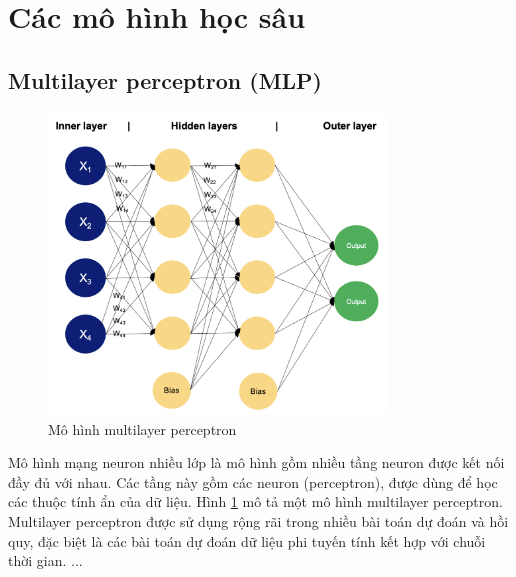 \section{Các mô hình học sâu}
\subsection{Multilayer perceptron (MLP)}

\begin{figure}[h]
    \centering
    \includegraphics[width=0.8\textwidth]{image/section3_4/mlp.png}
    \caption[Mô hình multilayer perceptron]{Mô hình multilayer perceptron \cite{mlp-img}}
    \label{fig:section3_4__1}
\end{figure}


Mô hình mạng neuron nhiều lớp là mô hình gồm nhiều tầng neuron được kết nối đầy đủ với nhau. Các tầng này gồm các neuron (perceptron), được dùng để học các thuộc tính ẩn của dữ liệu. Hình \ref{fig:section3_4__1} mô tả một mô hình 
multilayer perceptron. Multilayer perceptron được sử dụng rộng rãi trong nhiều bài toán dự đoán và hồi quy, đặc biệt là các bài toán dự đoán dữ liệu phi tuyến tính kết hợp với chuỗi thời gian.
...